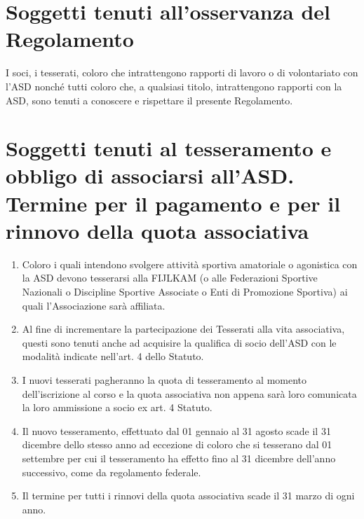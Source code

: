 \documentclass{djtsasddoc}
\begin{document}
	\section{Soggetti tenuti all'osservanza del Regolamento}
	I soci, i tesserati, coloro che intrattengono rapporti di lavoro o di volontariato con l'ASD nonché tutti coloro che, a qualsiasi titolo, intrattengono rapporti con la ASD, sono tenuti a conoscere e rispettare il presente Regolamento.
	
	\section{Soggetti tenuti al tesseramento e obbligo di associarsi all'ASD. Termine per il pagamento e per il rinnovo della quota associativa}
	\begin{enumerate}
		\item Coloro i quali intendono svolgere attività sportiva amatoriale o agonistica con la ASD devono tesserarsi alla FIJLKAM (o alle Federazioni Sportive Nazionali o Discipline Sportive Associate o Enti di Promozione Sportiva) ai quali l'Associazione sarà affiliata.
		\item Al fine di incrementare la partecipazione dei Tesserati alla vita associativa, questi sono tenuti anche ad acquisire la qualifica di socio dell'ASD con le modalità indicate nell'art. 4 dello Statuto.
		\item I nuovi tesserati pagheranno la quota di tesseramento al momento dell'iscrizione al corso e la quota associativa non appena sarà loro comunicata la loro ammissione a socio ex art. 4 Statuto. 
		\item Il nuovo tesseramento, effettuato dal 01 gennaio al 31 agosto scade il 31 dicembre dello stesso anno ad eccezione di coloro che si tesserano dal 01 settembre per cui il tesseramento ha effetto fino al 31 dicembre dell'anno successivo, come da regolamento federale.
		\item Il termine per tutti i rinnovi della quota associativa scade il 31 marzo di ogni anno.
	\end{enumerate}
	
\end{document}
